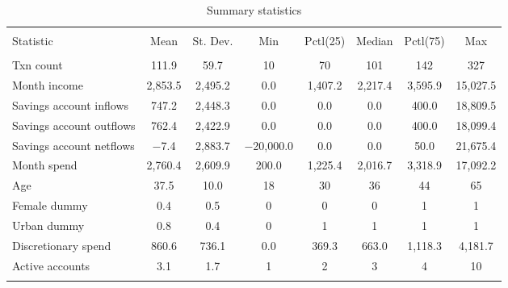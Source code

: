 
\begin{table}[H] \centering 
  \caption{Summary statistics} 
  \label{tab:sumstats} 
\footnotesize 
\begin{tabular}{@{\extracolsep{5pt}}lccccccc} 
\\[-1.8ex]\hline 
\hline \\[-1.8ex] 
Statistic & \multicolumn{1}{c}{Mean} & \multicolumn{1}{c}{St. Dev.} & \multicolumn{1}{c}{Min} & \multicolumn{1}{c}{Pctl(25)} & \multicolumn{1}{c}{Median} & \multicolumn{1}{c}{Pctl(75)} & \multicolumn{1}{c}{Max} \\ 
\hline \\[-1.8ex] 
Txn count & 111.9 & 59.7 & 10 & 70 & 101 & 142 & 327 \\ 
Month income & 2,853.5 & 2,495.2 & 0.0 & 1,407.2 & 2,217.4 & 3,595.9 & 15,027.5 \\ 
Savings account inflows & 747.2 & 2,448.3 & 0.0 & 0.0 & 0.0 & 400.0 & 18,809.5 \\ 
Savings account outflows & 762.4 & 2,422.9 & 0.0 & 0.0 & 0.0 & 400.0 & 18,099.4 \\ 
Savings account netflows & $-$7.4 & 2,883.7 & $-$20,000.0 & 0.0 & 0.0 & 50.0 & 21,675.4 \\ 
Month spend & 2,760.4 & 2,609.9 & 200.0 & 1,225.4 & 2,016.7 & 3,318.9 & 17,092.2 \\ 
Age & 37.5 & 10.0 & 18 & 30 & 36 & 44 & 65 \\ 
Female dummy & 0.4 & 0.5 & 0 & 0 & 0 & 1 & 1 \\ 
Urban dummy & 0.8 & 0.4 & 0 & 1 & 1 & 1 & 1 \\ 
Discretionary spend & 860.6 & 736.1 & 0.0 & 369.3 & 663.0 & 1,118.3 & 4,181.7 \\ 
Active accounts & 3.1 & 1.7 & 1 & 2 & 3 & 4 & 10 \\ 
\hline \\[-1.8ex] 
\end{tabular} 
\end{table} 

